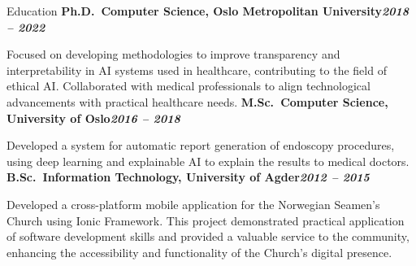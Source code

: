 \begin{rubric}{Education}
\entry*[]%
\textbf{Ph.D.~Computer Science, Oslo Metropolitan University\hfill\textit{2018 -- 2022}} \par
Focused on developing methodologies to improve transparency and interpretability in AI systems used in healthcare, contributing to the field of ethical AI.
Collaborated with medical professionals to align technological advancements with practical healthcare needs.
%
\entry*[]%
\textbf{M.Sc.~Computer Science, University of Oslo\hfill\textit{2016 -- 2018}} \par
Developed a system for automatic report generation of endoscopy procedures, using deep learning and explainable AI to explain the results to medical doctors.
% 
\entry*[]%
\textbf{B.Sc.~Information Technology, University of Agder\hfill\textit{2012 -- 2015}} \par
Developed a cross-platform mobile application for the Norwegian Seamen's Church using Ionic Framework. This project demonstrated practical application of software development skills and provided a valuable service to the community, enhancing the accessibility and functionality of the Church's digital presence.
\end{rubric}